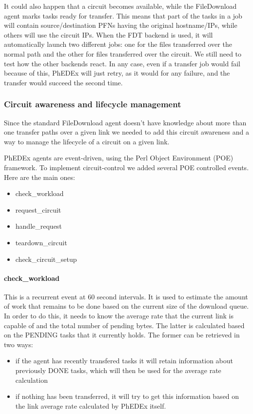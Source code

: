 It could also happen that a circuit becomes available, while the FileDownload agent
marks tasks ready for transfer. This means that part of the tasks in a job
will contain source/destination PFNs having the original hostname/IPs, while
others will use the circuit IPs. When the FDT backend is used, it will automatically
launch two different jobs: one for the files transferred over the normal path
and the other for files transferred over the circuit. We still need to test
how the other backends react. In any case, even if a transfer job would fail 
because of this, PhEDEx will just retry, as it would for any failure, and the transfer would succeed the second
time.

\subsubsection{Circuit awareness and lifecycle management}

Since the standard FileDownload agent doesn't have knowledge about more than one
transfer paths over a given link we needed to add this circuit awareness and a
way to manage the lifecycle of a circuit on a given link.

PhEDEx agents are event-driven, using the Perl Object Environment (POE\cite{POE}) framework.
To implement circuit-control we added several POE controlled events. Here are the main ones:

\begin{itemize}
  \item check\_workload
  \item request\_circuit
  \item handle\_request
  \item teardown\_circuit
  \item check\_circuit\_setup
\end{itemize}

\paragraph{check\_workload}
This is a recurrent event at 60 second intervals. It is used to estimate the 
amount of work that remains to be done based on the current size of the download
 queue. In order to do this, it needs to know the average rate that the current 
link is capable of and the total number of pending bytes. The latter is calculated
based on the PENDING tasks that it currently holds. The former can be retrieved
in two ways: 

\begin{itemize}
  \item if the agent has recently transfered tasks it will retain information about
previously DONE tasks, which will then be used for the average rate calculation
  \item if nothing has been transferred, it will try to get this information based
on the link average rate calculated by PhEDEx itself.
\end{itemize}

